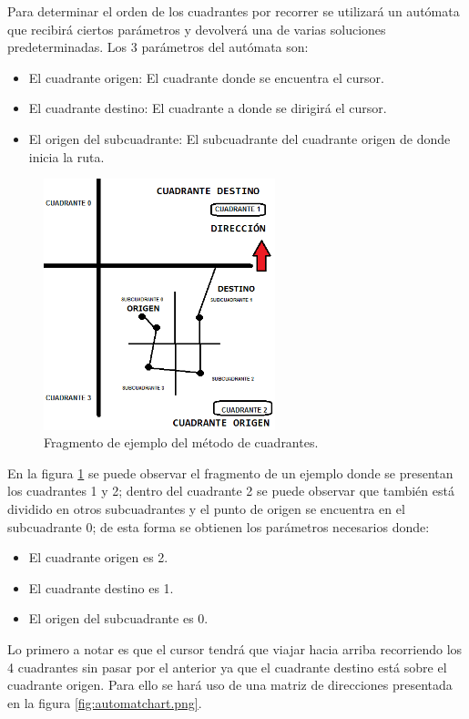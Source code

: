 Para determinar el orden de los cuadrantes por recorrer se utilizará un autómata que recibirá ciertos parámetros y devolverá una de varias soluciones predeterminadas. Los 3 parámetros del autómata son:
    \begin{itemize}
        \item El cuadrante origen: El cuadrante donde se encuentra el cursor.
        \item El cuadrante destino: El cuadrante a donde se dirigirá el cursor.
        \item El origen del subcuadrante: El subcuadrante del cuadrante origen de donde inicia la ruta.
    \end{itemize}
     \begin{figure}[hbtp]
        \centering
            \includegraphics[width=0.6\textwidth]{MetodoRectanguloAureo/Imagenes/findpriori.png}
            \caption{Fragmento de ejemplo del método de cuadrantes.}
            \label{fig:findpriori.png}
    \end{figure}
\hspace*{1cm} En la figura \ref {fig:findpriori.png} se puede observar el fragmento de un ejemplo donde se presentan los cuadrantes 1 y 2; dentro del cuadrante 2 se puede observar que también está dividido en otros subcuadrantes y el punto de origen se encuentra en el subcuadrante 0; de esta forma se obtienen los parámetros necesarios donde:
    \begin{itemize}
        \item El cuadrante origen es 2.
        \item El cuadrante destino es 1.
        \item El origen del subcuadrante es 0.
    \end{itemize}
\hspace*{1cm} Lo primero a notar es que el cursor tendrá que viajar hacia arriba recorriendo los 4 cuadrantes sin pasar por el anterior ya que el cuadrante destino está sobre el cuadrante origen. Para ello se hará uso de una matriz de direcciones presentada en la figura \ref {fig:automatchart.png}.\\

